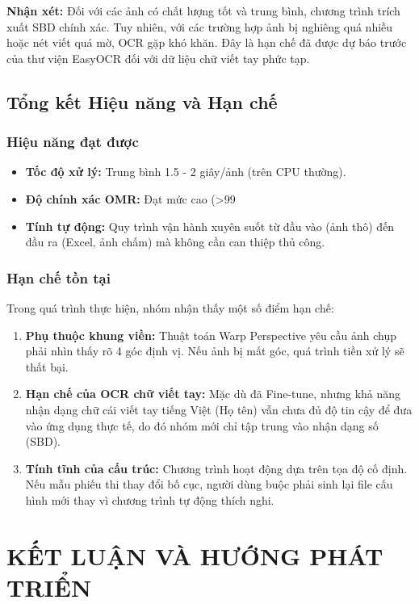 \documentclass[6pt, a4paper]{report}
\begin{document}
	\textbf{Nhận xét:} 
	Đối với các ảnh có chất lượng tốt và trung bình, chương trình trích xuất SBD chính xác. Tuy nhiên, với các trường hợp ảnh bị nghiêng quá nhiều hoặc nét viết quá mờ, OCR gặp khó khăn. Đây là hạn chế đã được dự báo trước của thư viện EasyOCR đối với dữ liệu chữ viết tay phức tạp.
	
	\section{Tổng kết Hiệu năng và Hạn chế}
	
	\subsection{Hiệu năng đạt được}
	\begin{itemize}
		\item \textbf{Tốc độ xử lý:} Trung bình 1.5 - 2 giây/ảnh (trên CPU thường).
		\item \textbf{Độ chính xác OMR:} Đạt mức cao (>99%
		\item \textbf{Tính tự động:} Quy trình vận hành xuyên suốt từ đầu vào (ảnh thô) đến đầu ra (Excel, ảnh chấm) mà không cần can thiệp thủ công.
	\end{itemize}
	
	\subsection{Hạn chế tồn tại}
	Trong quá trình thực hiện, nhóm nhận thấy một số điểm hạn chế:
	\begin{enumerate}
		\item \textbf{Phụ thuộc khung viền:} Thuật toán Warp Perspective yêu cầu ảnh chụp phải nhìn thấy rõ 4 góc định vị. Nếu ảnh bị mất góc, quá trình tiền xử lý sẽ thất bại.
		\item \textbf{Hạn chế của OCR chữ viết tay:} Mặc dù đã Fine-tune, nhưng khả năng nhận dạng chữ cái viết tay tiếng Việt (Họ tên) vẫn chưa đủ độ tin cậy để đưa vào ứng dụng thực tế, do đó nhóm mới chỉ tập trung vào nhận dạng số (SBD).
		\item \textbf{Tính tĩnh của cấu trúc:} Chương trình hoạt động dựa trên tọa độ cố định. Nếu mẫu phiếu thi thay đổi bố cục, người dùng buộc phải sinh lại file cấu hình mới thay vì chương trình tự động thích nghi.
	\end{enumerate}
	
	\chapter{KẾT LUẬN VÀ HƯỚNG PHÁT TRIỂN}
	
\end{document}
